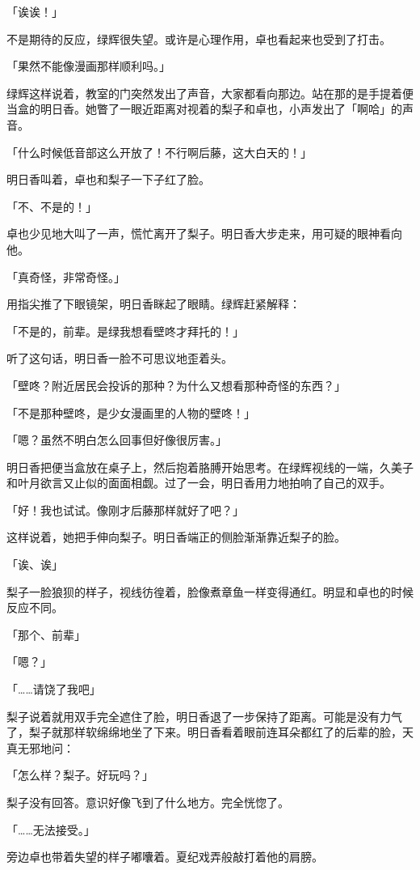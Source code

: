 \documentclass[UTF8]{ctexart}
\begin{document}
    「诶诶！」

    不是期待的反应，绿辉很失望。或许是心理作用，卓也看起来也受到了打击。

    「果然不能像漫画那样顺利吗。」

    绿辉这样说着，教室的门突然发出了声音，大家都看向那边。站在那的是手提着便当盒的明日香。她瞥了一眼近距离对视着的梨子和卓也，小声发出了「啊哈」的声音。

    「什么时候低音部这么开放了！不行啊后藤，这大白天的！」

    明日香叫着，卓也和梨子一下子红了脸。

    「不、不是的！」

    卓也少见地大叫了一声，慌忙离开了梨子。明日香大步走来，用可疑的眼神看向他。

    「真奇怪，非常奇怪。」

    用指尖推了下眼镜架，明日香眯起了眼睛。绿辉赶紧解释：

    「不是的，前辈。是绿我想看壁咚才拜托的！」

    听了这句话，明日香一脸不可思议地歪着头。

    「壁咚？附近居民会投诉的那种？为什么又想看那种奇怪的东西？」

    「不是那种壁咚，是少女漫画里的人物的壁咚！」

    「嗯？虽然不明白怎么回事但好像很厉害。」

    明日香把便当盒放在桌子上，然后抱着胳膊开始思考。在绿辉视线的一端，久美子和叶月欲言又止似的面面相觑。过了一会，明日香用力地拍响了自己的双手。

    「好！我也试试。像刚才后藤那样就好了吧？」

    这样说着，她把手伸向梨子。明日香端正的侧脸渐渐靠近梨子的脸。

    「诶、诶」

    梨子一脸狼狈的样子，视线彷徨着，脸像煮章鱼一样变得通红。明显和卓也的时候反应不同。

    「那个、前辈」

    「嗯？」

    「……请饶了我吧」

    梨子说着就用双手完全遮住了脸，明日香退了一步保持了距离。可能是没有力气了，梨子就那样软绵绵地坐了下来。明日香看着眼前连耳朵都红了的后辈的脸，天真无邪地问：

    「怎么样？梨子。好玩吗？」

    梨子没有回答。意识好像飞到了什么地方。完全恍惚了。

    「……无法接受。」

    旁边卓也带着失望的样子嘟囔着。夏纪戏弄般敲打着他的肩膀。
\end{document}

